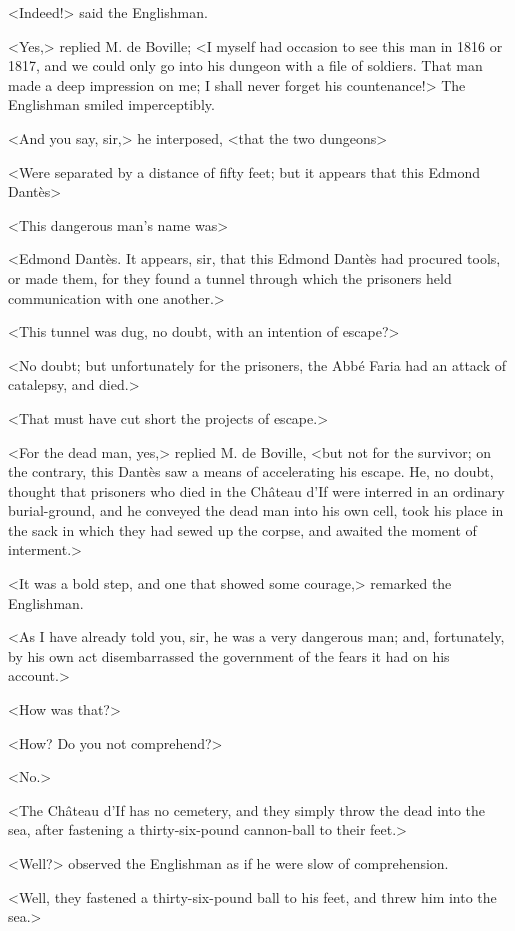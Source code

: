  <Indeed!> said the Englishman. 

 <Yes,> replied M. de Boville; <I myself had occasion to see this man in 1816 or 1817, and we could only go into his dungeon with a file of soldiers. That man made a deep impression on me; I shall never forget his countenance!>  The Englishman smiled imperceptibly. 

 <And you say, sir,> he interposed, <that the two dungeons\longdash> 

 <Were separated by a distance of fifty feet; but it appears that this Edmond Dantès\longdash> 

 <This dangerous man's name was\longdash> 

 <Edmond Dantès. It appears, sir, that this Edmond Dantès had procured tools, or made them, for they found a tunnel through which the prisoners held communication with one another.> 

 <This tunnel was dug, no doubt, with an intention of escape?> 

 <No doubt; but unfortunately for the prisoners, the Abbé Faria had an attack of catalepsy, and died.> 

 <That must have cut short the projects of escape.> 

 <For the dead man, yes,> replied M. de Boville, <but not for the survivor; on the contrary, this Dantès saw a means of accelerating his escape. He, no doubt, thought that prisoners who died in the Château d'If were interred in an ordinary burial-ground, and he conveyed the dead man into his own cell, took his place in the sack in which they had sewed up the corpse, and awaited the moment of interment.> 

 <It was a bold step, and one that showed some courage,> remarked the Englishman. 

 <As I have already told you, sir, he was a very dangerous man; and, fortunately, by his own act disembarrassed the government of the fears it had on his account.> 

 <How was that?> 

 <How? Do you not comprehend?> 

 <No.> 

 <The Château d'If has no cemetery, and they simply throw the dead into the sea, after fastening a thirty-six-pound cannon-ball to their feet.> 

 <Well?> observed the Englishman as if he were slow of comprehension. 

 <Well, they fastened a thirty-six-pound ball to his feet, and threw him into the sea.> 


